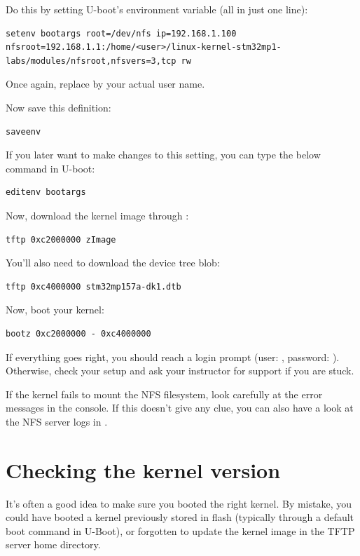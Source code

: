 Do this by setting U-boot's  environment variable (all in
just one line):

\begin{verbatim}
setenv bootargs root=/dev/nfs ip=192.168.1.100
nfsroot=192.168.1.1:/home/<user>/linux-kernel-stm32mp1-labs/modules/nfsroot,nfsvers=3,tcp rw
\end{verbatim}

Once again, replace  by your actual user name.

Now save this definition:
\begin{verbatim}
saveenv
\end{verbatim}

If you later want to make changes to this setting, you can type the
below command in U-boot:

\begin{verbatim}
editenv bootargs
\end{verbatim}

Now, download the kernel image through :

\begin{verbatim}
tftp 0xc2000000 zImage
\end{verbatim}

You'll also need to download the device tree blob:

\begin{verbatim}
tftp 0xc4000000 stm32mp157a-dk1.dtb
\end{verbatim}

Now, boot your kernel:

\begin{verbatim}
bootz 0xc2000000 - 0xc4000000
\end{verbatim}

If everything goes right, you should reach a login prompt (user:
, password: ). Otherwise, check your setup and
ask your instructor for support if you are stuck.

If the kernel fails to mount the NFS filesystem, look carefully at the
error messages in the console. If this doesn't give any clue, you can
also have a look at the NFS server logs in .

\section{Checking the kernel version}

It's often a good idea to make sure you booted the right kernel.
By mistake, you could have booted a kernel previously stored in flash
(typically through a default boot command in U-Boot), or forgotten to
update the kernel image in the TFTP server home directory.


